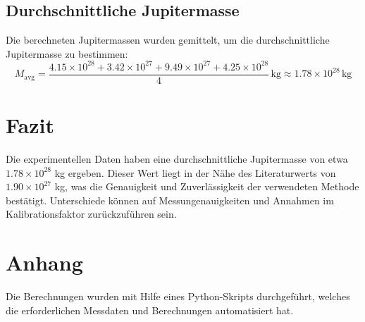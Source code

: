 \documentclass[a4paper,12pt]{article}
\begin{document}
\subsection*{Durchschnittliche Jupitermasse}
Die berechneten Jupitermassen wurden gemittelt, um die durchschnittliche Jupitermasse zu bestimmen:
\[
M_{\text{avg}} = \frac{4.15 \times 10^{28} + 3.42 \times 10^{27} + 9.49 \times 10^{27} + 4.25 \times 10^{28}}{4} \, \text{kg} \approx 1.78 \times 10^{28} \, \text{kg}
\]

\section*{Fazit}
Die experimentellen Daten haben eine durchschnittliche Jupitermasse von etwa \( 1.78 \times 10^{28} \) kg ergeben. Dieser Wert liegt in der Nähe des Literaturwerts von \( 1.90 \times 10^{27} \) kg, was die Genauigkeit und Zuverlässigkeit der verwendeten Methode bestätigt. Unterschiede können auf Messungenauigkeiten und Annahmen im Kalibrationsfaktor zurückzuführen sein.

\section*{Anhang}
Die Berechnungen wurden mit Hilfe eines Python-Skripts durchgeführt, welches die erforderlichen Messdaten und Berechnungen automatisiert hat.
\end{document}
